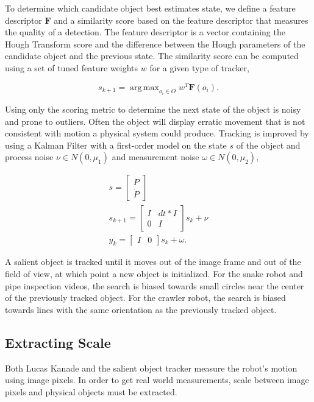 \documentclass[letterpaper, 10 pt, conference]{ieeeconf}
\DeclareMathOperator*{\argmax}{arg\,max}
\begin{document}
To determine which candidate object best estimates state, we define a feature descriptor $\textbf{F}$ and a similarity score based on the feature descriptor that measures the quality of a detection. The feature descriptor is a vector containing the Hough Transform score and the difference between the Hough parameters of the candidate object and the previous state. The similarity score can be computed using a set of tuned feature weights $w$ for a given type of tracker,


\begin{equation}
	s_{k+1} = \argmax_{o_i \in O} w^T \textbf{F}(o_i).
\end{equation}


Using only the scoring metric to determine the next state of the object is noisy and prone to outliers. Often the object will display erratic movement that is not consistent with motion a physical system could produce. Tracking is improved by using a Kalman Filter with a first-order model on the state $s$ of the object and process noise $\nu \in N(0, \mu_1)$ and measurement noise $\omega \in N(0, \mu_2)$,

\begin{eqnarray*}
s = \begin{bmatrix} P \\ \dot{P} \end{bmatrix} \\
s_{k+1} = \begin{bmatrix} I & dt * I \\ 0 & I \end{bmatrix} s_{k} + \nu \\
y_k = \begin{bmatrix} I & 0 \end{bmatrix} s_k + \omega.
\end{eqnarray*}


A salient object is tracked until it moves out of the image frame and out of the field of view, at which point a new object is initialized. For the snake robot and pipe inspection videos, the search is biased towards small circles near the center of the previously tracked object. For the crawler robot, the search is biased towards lines with the same orientation as the previously tracked object.

\subsection{Extracting Scale}

Both Lucas Kanade and the salient object tracker measure the robot's motion using image pixels. In order to get real world measurements, scale between image pixels and physical objects must be extracted.
\end{document}

